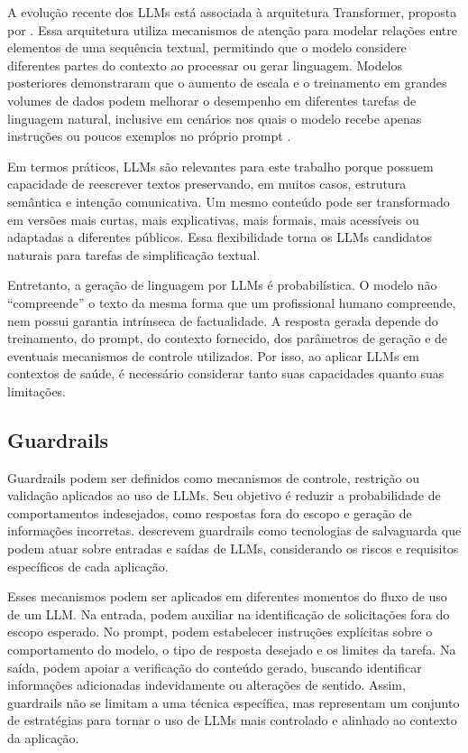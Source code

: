 A evolução recente dos LLMs está associada à arquitetura Transformer, proposta por . Essa arquitetura utiliza mecanismos de atenção para modelar relações entre elementos de uma sequência textual, permitindo que o modelo considere diferentes partes do contexto ao processar ou gerar linguagem. Modelos posteriores demonstraram que o aumento de escala e o treinamento em grandes volumes de dados podem melhorar o desempenho em diferentes tarefas de linguagem natural, inclusive em cenários nos quais o modelo recebe apenas instruções ou poucos exemplos no próprio prompt \cite{brown2020language}.

Em termos práticos, LLMs são relevantes para este trabalho porque possuem capacidade de reescrever textos preservando, em muitos casos, estrutura semântica e intenção comunicativa. Um mesmo conteúdo pode ser transformado em versões mais curtas, mais explicativas, mais formais, mais acessíveis ou adaptadas a diferentes públicos. Essa flexibilidade torna os LLMs candidatos naturais para tarefas de simplificação textual.

Entretanto, a geração de linguagem por LLMs é probabilística. O modelo não ``compreende'' o texto da mesma forma que um profissional humano compreende, nem possui garantia intrínseca de factualidade. A resposta gerada depende do treinamento, do prompt, do contexto fornecido, dos parâmetros de geração e de eventuais mecanismos de controle utilizados. Por isso, ao aplicar LLMs em contextos de saúde, é necessário considerar tanto suas capacidades quanto suas limitações.

\subsection{Guardrails}
\label{sec:guardrails-llms}

Guardrails podem ser definidos como mecanismos de controle, restrição ou validação aplicados ao uso de LLMs. Seu objetivo é reduzir a probabilidade de comportamentos indesejados, como respostas fora do escopo e geração de informações incorretas.  descrevem guardrails como tecnologias de salvaguarda que podem atuar sobre entradas e saídas de LLMs, considerando os riscos e requisitos específicos de cada aplicação.

Esses mecanismos podem ser aplicados em diferentes momentos do fluxo de uso de um LLM. Na entrada, podem auxiliar na identificação de solicitações fora do escopo esperado. No prompt, podem estabelecer instruções explícitas sobre o comportamento do modelo, o tipo de resposta desejado e os limites da tarefa. Na saída, podem apoiar a verificação do conteúdo gerado, buscando identificar informações adicionadas indevidamente ou alterações de sentido. Assim, guardrails não se limitam a uma técnica específica, mas representam um conjunto de estratégias para tornar o uso de LLMs mais controlado e alinhado ao contexto da aplicação.

